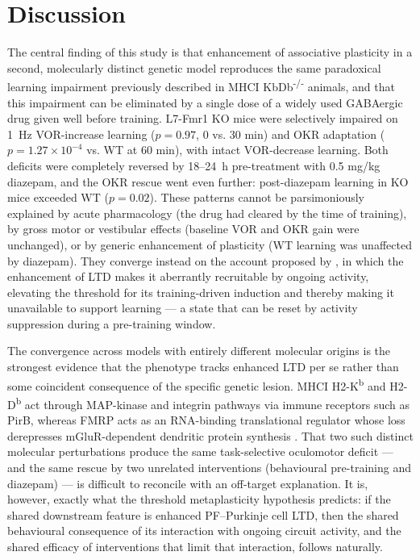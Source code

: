 \documentclass[11pt]{article}
\begin{document}
\section{Discussion}

The central finding of this study is that enhancement of associative
plasticity in a second, molecularly distinct genetic model reproduces the
same paradoxical learning impairment previously described in
MHCI KbDb\textsuperscript{-/-} animals, and that this impairment can be
eliminated by a single dose of a widely used GABAergic drug given well
before training. L7-Fmr1 KO mice were selectively impaired on 1~Hz
VOR-increase learning ($p = 0.97$, 0 vs. 30 min) and OKR adaptation
($p = 1.27 \times 10^{-4}$ vs. WT at 60 min), with intact VOR-decrease
learning. Both deficits were completely reversed by 18--24~h
pre-treatment with 0.5 mg/kg diazepam, and the OKR rescue went even
further: post-diazepam learning in KO mice exceeded WT ($p = 0.02$).
These patterns cannot be parsimoniously explained by acute pharmacology
(the drug had cleared by the time of training), by gross motor or
vestibular effects (baseline VOR and OKR gain were unchanged), or by
generic enhancement of plasticity (WT learning was unaffected by diazepam).
They converge instead on the account proposed by
\citet{nguyenvu2017saturation}, in which the enhancement of LTD makes it
aberrantly recruitable by ongoing activity, elevating the threshold for
its training-driven induction and thereby making it unavailable to support
learning --- a state that can be reset by activity suppression during a
pre-training window.

The convergence across models with entirely different molecular origins
is the strongest evidence that the phenotype tracks enhanced LTD per se
rather than some coincident consequence of the specific genetic lesion.
MHCI H2-K\textsuperscript{b} and H2-D\textsuperscript{b} act through
MAP-kinase and integrin pathways via immune receptors such as PirB,
whereas FMRP acts as an RNA-binding translational regulator whose loss
derepresses mGluR-dependent dendritic protein synthesis
\citep{koekkoek2005fmr1, nosyreva2006fmr1}. That two such distinct
molecular perturbations produce the same task-selective oculomotor deficit
--- and the same rescue by two unrelated interventions (behavioural
pre-training and diazepam) --- is difficult to reconcile with an off-target
explanation. It is, however, exactly what the threshold metaplasticity
hypothesis predicts: if the shared downstream feature is enhanced
PF--Purkinje cell LTD, then the shared behavioural consequence of its
interaction with ongoing circuit activity, and the shared efficacy of
interventions that limit that interaction, follows naturally.
\end{document}
